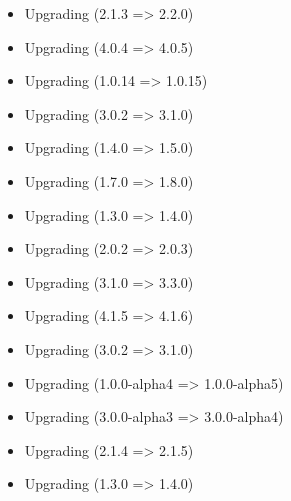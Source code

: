 \begin{itemize}
    \item Upgrading  (2.1.3 => 2.2.0)
    \item Upgrading  (4.0.4 => 4.0.5)
    \item Upgrading  (1.0.14 => 1.0.15)
    \item Upgrading  (3.0.2 => 3.1.0)
    \item Upgrading  (1.4.0 => 1.5.0)
    \item Upgrading  (1.7.0 => 1.8.0)
    \item Upgrading  (1.3.0 => 1.4.0)
    \item Upgrading  (2.0.2 => 2.0.3)
    \item Upgrading  (3.1.0 => 3.3.0)
    \item Upgrading  (4.1.5 => 4.1.6)
    \item Upgrading  (3.0.2 => 3.1.0)
    \item Upgrading  (1.0.0-alpha4 => 1.0.0-alpha5)
    \item Upgrading  (3.0.0-alpha3 => 3.0.0-alpha4)
    \item Upgrading  (2.1.4 => 2.1.5)
    \item Upgrading  (1.3.0 => 1.4.0)
\end{itemize}
